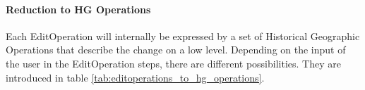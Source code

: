 
\paragraph{Reduction to HG Operations} %
\label{par:reduction_to_hg_operations}


Each EditOperation will internally be expressed by a set of Historical Geographic Operations that describe the change on a low level. Depending on the input of the user in the EditOperation steps, there are different possibilities. They are introduced in table \ref{tab:editoperations_to_hg_operations}.

